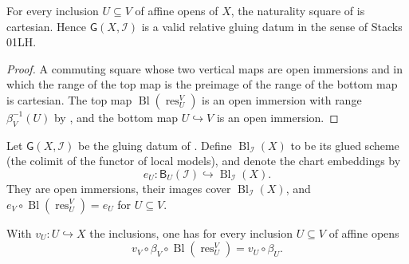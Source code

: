 \begin{lemma}
  \label{lemma:nagata-global-blowup-glue-data-valid}
  \leanok

  For every inclusion $U\subseteq V$ of affine opens of $X$, the
  naturality square of 
  is cartesian.  Hence $\mathsf G(X,\mathcal I)$ is a valid relative
  gluing datum in the sense of Stacks 01LH.
\end{lemma}

\begin{proof}
  \leanok
  A commuting square whose two vertical maps are open immersions and in
  which the range of the top map is the preimage of the range of the
  bottom map is cartesian.  The top map
  $\operatorname{Bl}(\operatorname{res}^V_U)$ is an open immersion with
  range $\beta_V^{-1}(U)$ by
  , and the bottom
  map $U\hookrightarrow V$ is an open immersion.
\end{proof}

\begin{definition}
  \label{def:nagata-global-blowup}
  \leanok

  Let $\mathsf G(X,\mathcal I)$ be the gluing datum of
  .  Define
  $\operatorname{Bl}_{\mathcal I}(X)$ to be its glued scheme (the
  colimit of the functor of local models), and denote the chart
  embeddings by
  \[
    e_U\colon\mathsf B_U(\mathcal I)
      \hookrightarrow\operatorname{Bl}_{\mathcal I}(X).
  \]
  They are open immersions, their images cover
  $\operatorname{Bl}_{\mathcal I}(X)$, and
  $e_V\circ\operatorname{Bl}(\operatorname{res}^V_U)=e_U$ for
  $U\subseteq V$.
\end{definition}

\begin{lemma}
  \label{lemma:nagata-global-blowup-local-maps-agree}
  \leanok

  With $v_U\colon U\hookrightarrow X$ the inclusions, one has for every
  inclusion $U\subseteq V$ of affine opens
  \[
    v_V\circ\beta_V\circ\operatorname{Bl}(\operatorname{res}^V_U)
      =v_U\circ\beta_U.
  \]
\end{lemma}

